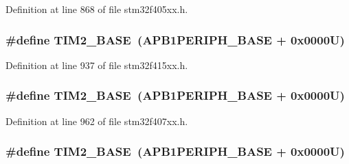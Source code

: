 Definition at line 868 of file stm32f405xx.\+h.

\subsubsection[{\texorpdfstring{T\+I\+M2\+\_\+\+B\+A\+SE}{TIM2_BASE}}]{\setlength{\rightskip}{0pt plus 5cm}\#define T\+I\+M2\+\_\+\+B\+A\+SE~({\bf A\+P\+B1\+P\+E\+R\+I\+P\+H\+\_\+\+B\+A\+SE} + 0x0000\+U)}\hypertarget{group___peripheral__registers__structures_ga00d0fe6ad532ab32f0f81cafca8d3aa5}{}\label{group___peripheral__registers__structures_ga00d0fe6ad532ab32f0f81cafca8d3aa5}


Definition at line 937 of file stm32f415xx.\+h.

\subsubsection[{\texorpdfstring{T\+I\+M2\+\_\+\+B\+A\+SE}{TIM2_BASE}}]{\setlength{\rightskip}{0pt plus 5cm}\#define T\+I\+M2\+\_\+\+B\+A\+SE~({\bf A\+P\+B1\+P\+E\+R\+I\+P\+H\+\_\+\+B\+A\+SE} + 0x0000\+U)}\hypertarget{group___peripheral__registers__structures_ga00d0fe6ad532ab32f0f81cafca8d3aa5}{}\label{group___peripheral__registers__structures_ga00d0fe6ad532ab32f0f81cafca8d3aa5}


Definition at line 962 of file stm32f407xx.\+h.

\subsubsection[{\texorpdfstring{T\+I\+M2\+\_\+\+B\+A\+SE}{TIM2_BASE}}]{\setlength{\rightskip}{0pt plus 5cm}\#define T\+I\+M2\+\_\+\+B\+A\+SE~({\bf A\+P\+B1\+P\+E\+R\+I\+P\+H\+\_\+\+B\+A\+SE} + 0x0000\+U)}\hypertarget{group___peripheral__registers__structures_ga00d0fe6ad532ab32f0f81cafca8d3aa5}{}\label{group___peripheral__registers__structures_ga00d0fe6ad532ab32f0f81cafca8d3aa5}


